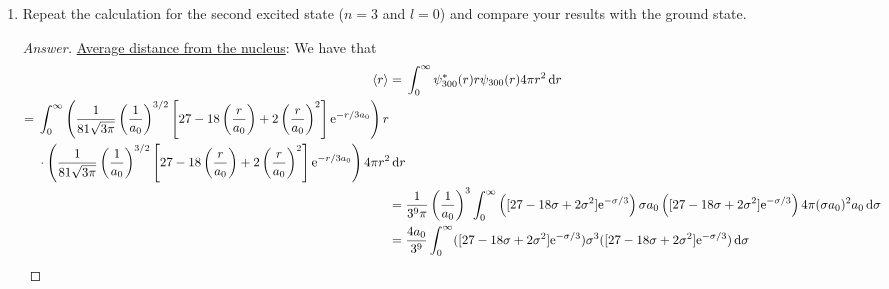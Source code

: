 \documentclass[../psets.tex]{subfiles}
\begin{document}
\begin{enumerate}
\begin{enumerate}
        \begin{proof}[Answer]
            We have from \textcite[211]{bib:McQuarrieSimon} that the probability that the electron is between $r$ and $r+\dd{r}$ is
            \begin{equation*}
                \Prob(r) = \frac{4}{a_0^3}r^2\e[-2r/a_0]
            \end{equation*}
            We want to find the point where $\dv*{\Prob(r)}{r}=0$, as this will be the maximum. We can do this as follows.
            \begin{align*}
                0 &= \dv{r}\left( \frac{4}{a_0^3}r^2\e[-2r/a_0] \right)\\
                &= \frac{4}{a_0^3}\left( 2r\e[-2r/a_0]-\frac{2r^2}{a_0}\e[-2r/a_0] \right)\\
                &= \e[-2r/a_0]-\frac{r}{a_0}\e[-2r/a_0]\\
                \frac{r}{a_0} &= 1\\
                \Aboxed{r &= a_0}
            \end{align*}
        \end{proof}
        \item Repeat the calculation for the second excited state ($n=3$ and $l=0$) and compare your results with the ground state.
        \begin{proof}[Answer]
            \underline{Average distance from the nucleus}: We have that
            \begin{align*}
                \prb{r} ={}& \int_0^\infty\psi_{300}^*(r)r\psi_{300}(r)4\pi r^2\dd{r}\\
                \begin{split}
                    ={}& \int_0^\infty\left( \frac{1}{81\sqrt{3\pi}}\left( \frac{1}{a_0} \right)^{3/2}\left[ 27-18\left( \frac{r}{a_0} \right)+2\left( \frac{r}{a_0} \right)^2 \right]\e[-r/3a_0] \right)r\\
                    & \cdot\left( \frac{1}{81\sqrt{3\pi}}\left( \frac{1}{a_0} \right)^{3/2}\left[ 27-18\left( \frac{r}{a_0} \right)+2\left( \frac{r}{a_0} \right)^2 \right]\e[-r/3a_0] \right)4\pi r^2\dd{r}
                \end{split}\\
                ={}& \frac{1}{3^9\pi}\left( \frac{1}{a_0} \right)^3\int_0^\infty\left( [27-18\sigma+2\sigma^2]\e[-\sigma/3] \right)\sigma a_0\left( [27-18\sigma+2\sigma^2]\e[-\sigma/3] \right)4\pi(\sigma a_0)^2a_0\dd{\sigma}\\
                ={}& \frac{4a_0}{3^9}\int_0^\infty([27-18\sigma+2\sigma^2]\e[-\sigma/3])\sigma^3([27-18\sigma+2\sigma^2]\e[-\sigma/3])\dd{\sigma}\\

\end{align*}
\end{proof}
\end{enumerate}
\end{enumerate}
\end{document}
